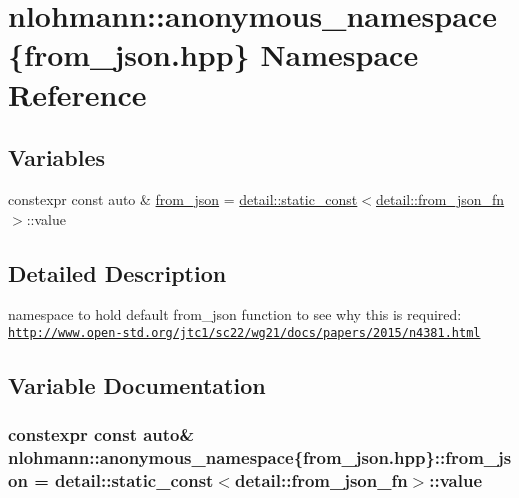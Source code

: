 \hypertarget{namespacenlohmann_1_1anonymous__namespace_02from__json_8hpp_03}{}\section{nlohmann\+:\+:anonymous\+\_\+namespace\{from\+\_\+json.\+hpp\} Namespace Reference}
\label{namespacenlohmann_1_1anonymous__namespace_02from__json_8hpp_03}
\subsection*{Variables}
\begin{DoxyCompactItemize}
\item 
constexpr const auto \& \hyperlink{namespacenlohmann_1_1anonymous__namespace_02from__json_8hpp_03_a8da2cbc27f4ff99aff5c20428fbcce4c}{from\+\_\+json} = \hyperlink{structnlohmann_1_1detail_1_1static__const}{detail\+::static\+\_\+const}$<$\hyperlink{structnlohmann_1_1detail_1_1from__json__fn}{detail\+::from\+\_\+json\+\_\+fn}$>$\+::value
\end{DoxyCompactItemize}


\subsection{Detailed Description}
namespace to hold default {\ttfamily from\+\_\+json} function to see why this is required\+: \href{http://www.open-std.org/jtc1/sc22/wg21/docs/papers/2015/n4381.html}{\tt http\+://www.\+open-\/std.\+org/jtc1/sc22/wg21/docs/papers/2015/n4381.\+html} 

\subsection{Variable Documentation}
\subsubsection[{\texorpdfstring{from\+\_\+json}{from_json}}]{\setlength{\rightskip}{0pt plus 5cm}constexpr const auto\& nlohmann\+::anonymous\+\_\+namespace\{from\+\_\+json.\+hpp\}\+::from\+\_\+json = {\bf detail\+::static\+\_\+const}$<${\bf detail\+::from\+\_\+json\+\_\+fn}$>$\+::value}\hypertarget{namespacenlohmann_1_1anonymous__namespace_02from__json_8hpp_03_a8da2cbc27f4ff99aff5c20428fbcce4c}{}\label{namespacenlohmann_1_1anonymous__namespace_02from__json_8hpp_03_a8da2cbc27f4ff99aff5c20428fbcce4c}
